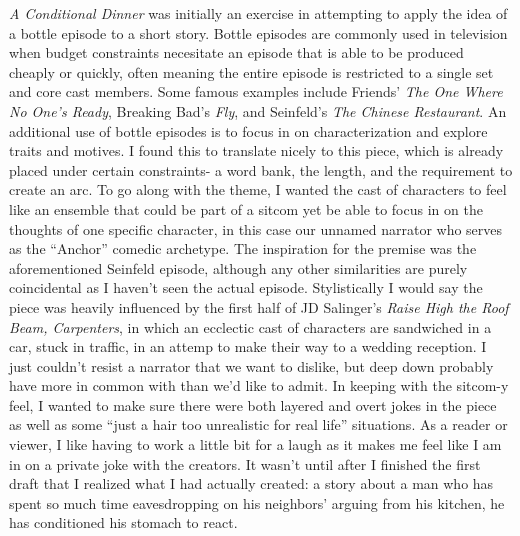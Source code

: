 \documentclass[]{book}
\begin{document}
\emph{A Conditional Dinner} was initially an exercise in attempting to
apply the idea of a bottle episode to a short story. Bottle episodes are
commonly used in television when budget constraints necesitate an
episode that is able to be produced cheaply or quickly, often meaning
the entire episode is restricted to a single set and core cast members.
Some famous examples include Friends' \emph{The One Where No One's
Ready}, Breaking Bad's \emph{Fly}, and Seinfeld's \emph{The Chinese
Restaurant}. An additional use of bottle episodes is to focus in on
characterization and explore traits and motives. I found this to
translate nicely to this piece, which is already placed under certain
constraints- a word bank, the length, and the requirement to create an
arc. To go along with the theme, I wanted the cast of characters to feel
like an ensemble that could be part of a sitcom yet be able to focus in
on the thoughts of one specific character, in this case our unnamed
narrator who serves as the ``Anchor'' comedic archetype. The inspiration
for the premise was the aforementioned Seinfeld episode, although any
other similarities are purely coincidental as I haven't seen the actual
episode. Stylistically I would say the piece was heavily influenced by
the first half of JD Salinger's \emph{Raise High the Roof Beam,
Carpenters}, in which an ecclectic cast of characters are sandwiched in
a car, stuck in traffic, in an attemp to make their way to a wedding
reception. I just couldn't resist a narrator that we want to dislike,
but deep down probably have more in common with than we'd like to admit.
In keeping with the sitcom-y feel, I wanted to make sure there were both
layered and overt jokes in the piece as well as some ``just a hair too
unrealistic for real life'' situations. As a reader or viewer, I like
having to work a little bit for a laugh as it makes me feel like I am in
on a private joke with the creators. It wasn't until after I finished
the first draft that I realized what I had actually created: a story
about a man who has spent so much time eavesdropping on his neighbors'
arguing from his kitchen, he has conditioned his stomach to react.


\end{document}
